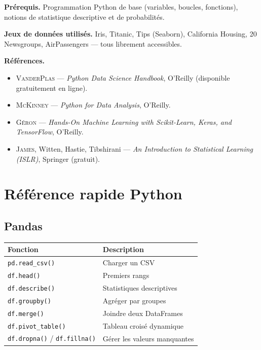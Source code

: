 \documentclass[12pt,a4paper,twoside]{book}
\theoremstyle{definition}
\theoremstyle{plain}
\theoremstyle{remark}
\newcommand{\py}[1]{\texttt{#1}}
\begin{document}
\medskip
\textbf{Pr\'erequis.} Programmation Python de base (variables, boucles, fonctions), notions de statistique descriptive et de probabilit\'es.

\medskip
\textbf{Jeux de donn\'ees utilis\'es.} Iris, Titanic, Tips (Seaborn), California Housing, 20 Newsgroups, AirPassengers --- tous librement accessibles.

\medskip
\textbf{R\'ef\'erences.}
\begin{itemize}
\item \textsc{VanderPlas} --- \emph{Python Data Science Handbook}, O'Reilly (disponible gratuitement en ligne).
\item \textsc{McKinney} --- \emph{Python for Data Analysis}, O'Reilly.
\item \textsc{G\'eron} --- \emph{Hands-On Machine Learning with Scikit-Learn, Keras, and TensorFlow}, O'Reilly.
\item \textsc{James}, Witten, Hastie, Tibshirani --- \emph{An Introduction to Statistical Learning (ISLR)}, Springer (gratuit).
\end{itemize}

\mainmatter













\backmatter
\appendix
\chapter{R\'ef\'erence rapide Python}
\label{app:python}

\section{Pandas}
\begin{tabular}{ll}
\toprule
\textbf{Fonction} & \textbf{Description} \\
\midrule
\py{pd.read_csv()} & Charger un CSV \\
\py{df.head()} & Premiers rangs \\
\py{df.describe()} & Statistiques descriptives \\
\py{df.groupby()} & Agr\'eger par groupes \\
\py{df.merge()} & Joindre deux DataFrames \\
\py{df.pivot_table()} & Tableau crois\'e dynamique \\
\py{df.dropna()} / \py{df.fillna()} & G\'erer les valeurs manquantes \\
\bottomrule
\end{tabular}
\end{document}
